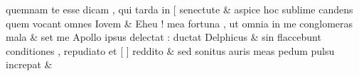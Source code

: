 \documentclass[12pt,onecolumn,twoside,a4paper]{memoir}
\begin{document}
\begin{pairs}
\begin{Leftside}
                              quemnam
                              te
                              esse
                              dicam
                              ,
                              qui
                              tarda
                              in
                              [
                              senectute \&
                         \stanza {}
                     aspice
                              hoc
                              sublime
                              candens
                              quem
                              vocant
                              omnes
                              Iovem \&
                         \stanza {}
                     Eheu
                              !
                              mea
                              fortuna
                              ,
                              ut
                              omnia
                              in
                              me
                              conglomeras
                              mala \&
                         \stanza {}
                     set
                              me
                              Apollo
                              ipsus
                              delectat
                              :
                              ductat
                              Delphicus \&
                         \stanza {}
                     sin
                              flaccebunt
                              conditiones
                              ,
                              repudiato
                              et
                              [
                              ]
                              reddito \&
                         \stanza {}
                     sed
                              sonitus
                              auris
                              meas
                              pedum
                              pulsu
                              increpat \&
                         \stanza {}
                     

\end{Leftside}
\end{pairs}
\end{document}
